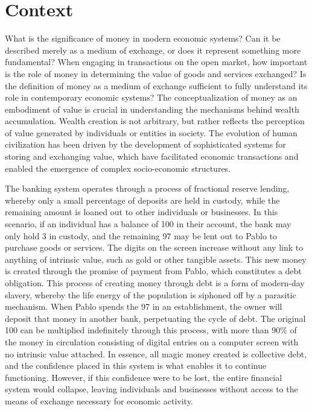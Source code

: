 \section{Context}
What is the significance of money in modern economic systems? Can it be described merely as a medium of exchange, or does it represent something 
more fundamental? When engaging in transactions on the open market, how important is the role of money in determining the value of goods and 
services exchanged? Is the definition of money as a medium of exchange sufficient to fully understand its role in contemporary economic systems? 
The conceptualization of money as an embodiment of value is crucial in understanding the mechanisms behind wealth accumulation. Wealth creation is 
not arbitrary, but rather reflects the perception of value generated by individuals or entities in society. The evolution of human civilization has 
been driven by the development of sophisticated systems for storing and exchanging value, which have facilitated economic transactions and enabled 
the emergence of complex socio-economic structures. 

The banking system operates through a process of fractional reserve lending, whereby only a small percentage of deposits are held in custody, while 
the remaining amount is loaned out to other individuals or businesses. In this scenario, if an individual has a balance of 100 in their account, 
the bank may only hold 3 in custody, and the remaining 97 may be lent out to Pablo to purchase goods or services. The digits on the screen increase 
without any link to anything of intrinsic value, such as gold or other tangible assets. This new money is created through the promise of payment 
from Pablo, which constitutes a debt obligation. This process of creating money through debt is a form of modern-day slavery, whereby the life 
energy of the population is siphoned off by a parasitic mechanism. When Pablo spends the 97 in an establishment, the owner will deposit that money 
in another bank, perpetuating the cycle of debt. The original 100 can be multiplied indefinitely through this process, with more than 90\% of the 
money in circulation consisting of digital entries on a computer screen with no intrinsic value attached. In essence, all magic money created is 
collective debt, and the confidence placed in this system is what enables it to continue functioning. However, if this confidence  were to be lost, 
the entire financial system would collapse, leaving individuals and businesses without access to the means of exchange necessary for economic 
activity.

